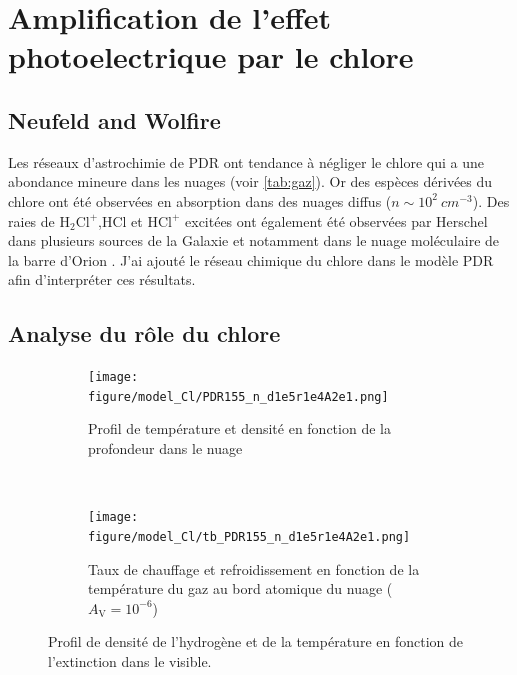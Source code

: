 


\section{Amplification de l'effet photoelectrique par le chlore}

\subsection{Neufeld and Wolfire}

Les réseaux d'astrochimie de PDR ont tendance à négliger le chlore qui a une abondance mineure dans les nuages (voir \autoref{tab:gaz}). Or des espèces dérivées du chlore ont été observées en absorption dans des nuages diffus ($n \sim 10^2\ cm^{-3}$). Des raies de $\mathrm{H}_2\mathrm{Cl}^+$,HCl et $\mathrm{HCl}^+$ excitées ont également été observées par Herschel dans plusieurs sources de la Galaxie et notamment dans le nuage moléculaire de la barre d'Orion \cite{Neufeld2012,Neufire2009}. J'ai ajouté le réseau chimique du chlore dans le modèle PDR afin d'interpréter ces résultats. \newline

\subsection{Analyse du rôle du chlore}

\begin{figure}[htbp]
    \centering
    \begin{subfigure}[t]{0.45\textwidth} %
        \centering \texttt{[image: figure/model\_Cl/PDR155\_n\_d1e5r1e4A2e1.png]}
        \caption{Profil de température et densité en fonction de la profondeur dans le nuage}\label{fig:ClT}
    \end{subfigure}
    ~ 
    \begin{subfigure}[t]{0.45\textwidth}
        \centering \texttt{[image: figure/model\_Cl/tb\_PDR155\_n\_d1e5r1e4A2e1.png]}
        \caption{Taux de chauffage et refroidissement en fonction de la température du gaz au bord atomique du nuage ($A_{\mathrm{V}} = 10^{-6}$)}\label{fig:ClHC}
    \end{subfigure}
    \caption{Profil de densité de l'hydrogène et de la température en fonction de l'extinction dans le visible.}
\end{figure}

